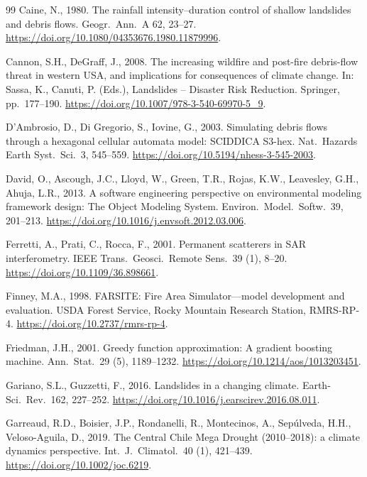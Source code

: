 \documentclass[authoryear,preprint,review,12pt]{elsarticle}
\begin{document}
\begin{thebibliography}{99}
Caine, N., 1980. The rainfall intensity--duration control of shallow landslides
and debris flows. Geogr.\ Ann.\ A 62, 23--27.
\url{https://doi.org/10.1080/04353676.1980.11879996}.

Cannon, S.H., DeGraff, J., 2008. The increasing wildfire and post-fire
debris-flow threat in western USA, and implications for consequences of climate
change. In: Sassa, K., Canuti, P. (Eds.), Landslides -- Disaster Risk Reduction.
Springer, pp.\ 177--190. \url{https://doi.org/10.1007/978-3-540-69970-5_9}.

D'Ambrosio, D., Di Gregorio, S., Iovine, G., 2003. Simulating debris flows
through a hexagonal cellular automata model: SCIDDICA S3-hex. Nat.\ Hazards
Earth Syst.\ Sci.\ 3, 545--559. \url{https://doi.org/10.5194/nhess-3-545-2003}.

David, O., Ascough, J.C., Lloyd, W., Green, T.R., Rojas, K.W., Leavesley, G.H.,
Ahuja, L.R., 2013. A software engineering perspective on environmental modeling
framework design: The Object Modeling System. Environ.\ Model.\ Softw.\ 39,
201--213. \url{https://doi.org/10.1016/j.envsoft.2012.03.006}.

Ferretti, A., Prati, C., Rocca, F., 2001. Permanent scatterers in SAR
interferometry. IEEE Trans.\ Geosci.\ Remote Sens.\ 39 (1), 8--20.
\url{https://doi.org/10.1109/36.898661}.

Finney, M.A., 1998. FARSITE: Fire Area Simulator---model development and
evaluation. USDA Forest Service, Rocky Mountain Research Station, RMRS-RP-4.
\url{https://doi.org/10.2737/rmrs-rp-4}.

Friedman, J.H., 2001. Greedy function approximation: A gradient boosting
machine. Ann.\ Stat.\ 29 (5), 1189--1232.
\url{https://doi.org/10.1214/aos/1013203451}.

Gariano, S.L., Guzzetti, F., 2016. Landslides in a changing climate.
Earth-Sci.\ Rev.\ 162, 227--252.
\url{https://doi.org/10.1016/j.earscirev.2016.08.011}.

Garreaud, R.D., Boisier, J.P., Rondanelli, R., Montecinos, A., Sep\'ulveda, H.H.,
Veloso-Aguila, D., 2019. The Central Chile Mega Drought (2010--2018): a climate
dynamics perspective. Int.\ J.\ Climatol.\ 40 (1), 421--439.
\url{https://doi.org/10.1002/joc.6219}.


\end{thebibliography}
\end{document}
